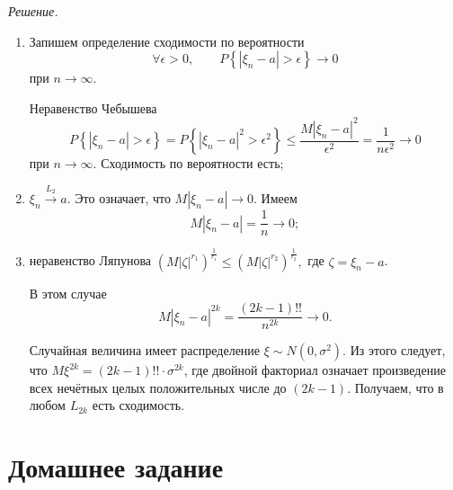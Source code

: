 \textit{Решение.}
\begin{enumerate}[label=\alph*)]
\item Запишем определение сходимости по вероятности
$$ \forall \epsilon > 0,
\qquad P \left\{ \left| \xi_n - a \right| > \epsilon \right\} \rightarrow 0$$
при $n \rightarrow \infty $.

Неравенство Чебышева
$$P \left\{ \left| \xi_n - a \right| > \epsilon \right\} =
P \left\{ \left| \xi_n - a \right|^2 > \epsilon^2 \right\} \leq
\frac{M \left| \xi_n - a \right|^2}{ \epsilon^2} =
\frac{1}{n \epsilon^2} \rightarrow
0$$
при $n \to \infty $.
Сходимость по вероятности есть;
\item $ \xi_n \overset{L_2}{ \rightarrow } a$.
Это означает, что $M \left| \xi_n - a \right| \rightarrow 0$.
Имеем
$$M \left| \xi_n - a \right| =
\frac{1}{n} \rightarrow
0;$$
\item неравенство Ляпунова
$ \left( M \left| \zeta \right|^{r_1} \right)^{ \frac{1}{r_1}} \leq \left( M \left| \zeta \right|^{r_2} \right)^{ \frac{1}{r_2}},$ где $ \zeta = \xi_n - a$.

В этом случае
$$M \left| \xi_n - a \right|^{2k} =
\frac{ \left( 2k-1 \right)!!}{n^{2k}} \rightarrow
0.$$

Случайная величина имеет распределение $ \xi \sim N \left( 0, \sigma^2 \right) $.
Из этого следует, что $M \xi^{2k} = \left( 2k-1 \right)!! \cdot \sigma^{2k}$,
где двойной факториал означает произведение всех нечётных целых положительных числе до $ \left( 2k-1 \right) $.
Получаем, что в любом $L_{2k}$ есть сходимость.
\end{enumerate}

\section*{Домашнее задание}
